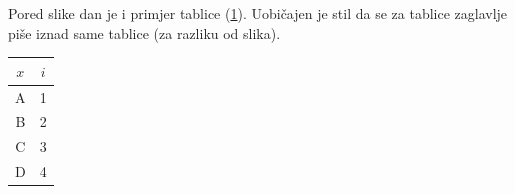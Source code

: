 Pored slike dan je i primjer tablice (\ref{tablica}). Uobičajen je stil da se
za tablice zaglavlje piše iznad same tablice (za razliku od slika). 
\begin{table}[!h]
\label{tablica}
  \centering
\begin{tabular}{|c|c|} \hline
    $x$ & $i$ \\\hline\hline
    A & 1 \\
    B & 2 \\
    C & 3 \\
    D & 4 \\ \hline
\end{tabular}
\end{table}

